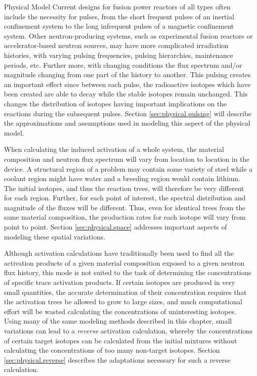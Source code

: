 \begin{chapter}{Physical Model\label{chap:physical}}
Current designs for fusion power reactors of all types often include
the necessity for pulses, from the short frequent pulses of an
inertial confinement system to the long infrequent pulses of a
magnetic confinement system.  Other neutron-producing systems, such as
experimental fusion reactors or accelerator-based neutron sources, may
have more complicated irradiation histories, with varying pulsing
frequencies, pulsing hierarchies, maintenance periods, etc.  Further
more, with changing conditions the flux spectrum and/or magnitude
changing from one part of the history to another.  This pulsing
creates an important
effect\cite{ref:Pulsar,ref:spangler,ref:spanglerMS} since between each
pulse, the radioactive isotopes which have been created are able to
decay while the stable isotopes remain unchanged.  This changes the
distribution of isotopes having important implications on the
reactions during the subsequent pulses.  Section
\ref{sec:physical.pulsing} will describe the approximations and
assumptions used in modeling this aspect of the physical model.

When calculating the induced activation of a whole system, the
material composition and neutron flux spectrum will vary from location
to location in the device.  A structural region of a problem may
contain some variety of steel while a coolant region might have water
and a breeding region would contain lithium.  The initial isotopes,
and thus the reaction trees, will therefore be very different for each
region.  Further, for each point of interest, the spectral
distribution and magnitude of the fluxes will be different.  Thus,
even for identical trees from the same material composition, the
production rates for each isotope will vary from point to point.
Section \ref{sec:physical.space} addresses important aspects of
modeling these spatial variations.

Although activation calculations have traditionally been used to find
all the activation products of a given material composition exposed to
a given neutron flux history, this mode is not suited to the task of
determining the concentrations of specific trace activation products.
If certain isotopes are produced in very small quantities, the
accurate determination of their concentration requires that the
activation trees be allowed to grow to large sizes, and much
computational effort will be wasted calculating the concentrations of
uninteresting isotopes.  Using many of the same modeling methods
described in this chapter, small variations can lead to a
\textsl{reverse} activation calculation, whereby the concentrations of
certain target isotopes can be calculated from the initial mixtures
without calculating the concentrations of too many non-target
isotopes.  Section \ref{sec:physical.reverse} describes the
adaptations necessary for such a reverse calculation.


\end{chapter}
